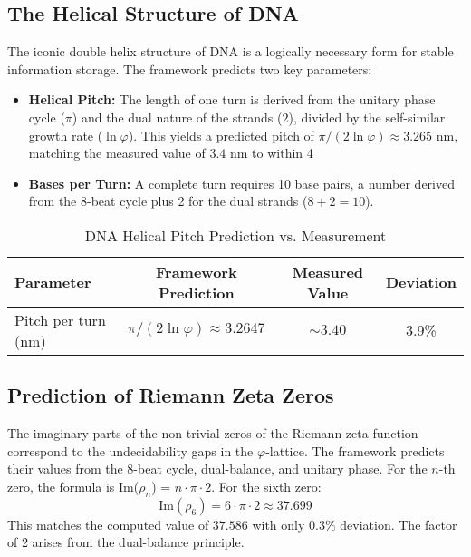 \documentclass[11pt,a4paper]{article}
\begin{document}
\subsection{The Helical Structure of DNA}
The iconic double helix structure of DNA is a logically necessary form for stable information storage. The framework predicts two key parameters:
\begin{itemize}
    \item \textbf{Helical Pitch:} The length of one turn is derived from the unitary phase cycle (\(\pi\)) and the dual nature of the strands (\(2\)), divided by the self-similar growth rate (\(\ln \varphi\)). This yields a predicted pitch of \(\pi / (2 \ln \varphi) \approx 3.265\) nm, matching the measured value of \(3.4\) nm to within 4%
    \item \textbf{Bases per Turn:} A complete turn requires 10 base pairs, a number derived from the 8-beat cycle plus 2 for the dual strands (\(8+2=10\)).
\end{itemize}

\begin{table}[h!]
\centering
\caption{DNA Helical Pitch Prediction vs. Measurement}
\label{tab:dna_pitch}
\begin{tabular}{lccc}
\toprule
\textbf{Parameter} & \textbf{Framework Prediction} & \textbf{Measured Value} & \textbf{Deviation} \\
\midrule
Pitch per turn (nm) & \(\pi / (2 \ln \varphi) \approx 3.2647\) & \(\sim 3.40\) & 3.9\% \\
\bottomrule
\end{tabular}
\end{table}

\subsection{Prediction of Riemann Zeta Zeros}
The imaginary parts of the non-trivial zeros of the Riemann zeta function correspond to the undecidability gaps in the \(\varphi\)-lattice. The framework predicts their values from the 8-beat cycle, dual-balance, and unitary phase. For the \(n\)-th zero, the formula is Im(\(\rho_n\)) = \(n \cdot \pi \cdot 2\). For the sixth zero:
\begin{equation}
\text{Im}(\rho_6) = 6 \cdot \pi \cdot 2 \approx 37.699
\end{equation}
This matches the computed value of \(37.586\) with only \(0.3\%\) deviation. The factor of 2 arises from the dual-balance principle.
\end{document}
